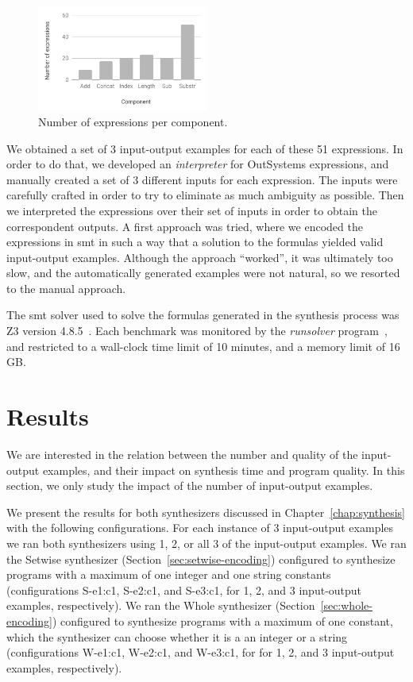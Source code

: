 \begin{figure}
  \centering
  \includegraphics[width=0.5\textwidth]{assets/bar-chart-components-freq-51.pdf}
  \caption{Number of expressions per component.}
  \label{fig:bar-chart-components-freq-51}
\end{figure}

We obtained a set of 3 input-output examples for each of these 51 expressions.
In order to do that, we developed an \textit{interpreter} for OutSystems
expressions, and manually created a set of 3 different inputs for each
expression.
The inputs were carefully crafted in order to try to eliminate as much ambiguity
as possible.
Then we interpreted the expressions over their set of inputs in order to
obtain the correspondent outputs.
A first approach was tried, where we encoded the expressions in \gls{smt} in
such a way that a solution to the formulas yielded valid input-output examples.
Although the approach ``worked'', it was ultimately too slow, and the
automatically generated examples were not natural, so we resorted to the manual
approach.

The \gls{smt} solver used to solve the formulas generated in the synthesis
process was Z3 version 4.8.5~\cite{DeMoura:2008:ZES}.
Each benchmark was monitored by the \textit{runsolver}
program~\cite{Roussel:2011:JSAT}, and restricted to a wall-clock time limit of
10 minutes, and a memory limit of 16 GB.

\section{Results}
\label{sec:results}

We are interested in the relation between the number and quality of the
input-output examples, and their impact on synthesis time and program quality.
In this section, we only study the impact of the number of input-output
examples.

We present the results for both synthesizers discussed in
Chapter~\ref{chap:synthesis} with the following configurations.
For each instance of 3 input-output examples we ran both synthesizers using 1,
2, or all 3 of the input-output examples.
We ran the Setwise synthesizer (Section~\ref{sec:setwise-encoding}) configured
to synthesize programs with a maximum of one integer and one string constants
(configurations S-e1:c1, S-e2:c1, and S-e3:c1, for 1, 2, and 3 input-output
examples, respectively).
We ran the Whole synthesizer (Section~\ref{sec:whole-encoding}) configured to
synthesize programs with a maximum of one constant, which the synthesizer can
choose whether it is a an integer or a string (configurations W-e1:c1, W-e2:c1,
and W-e3:c1, for for 1, 2, and 3 input-output examples, respectively).


